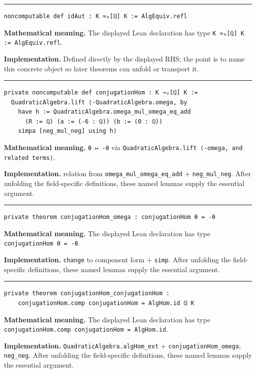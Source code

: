 \documentclass[UTF8,a4paper,11pt,fontset=fandol]{ctexart}
\theoremstyle{definition}
\newcommand{\statementsep}{\par\medskip\hrule\medskip}
\begin{document}
\statementsep
\begin{verbatim}
noncomputable def idAut : K ≃ₐ[ℚ] K := AlgEquiv.refl
\end{verbatim}
\noindent\textbf{Mathematical meaning.} The displayed Lean declaration has type \texttt{K ≃ₐ[ℚ] K := AlgEquiv.\allowbreak{}refl}.\par
\noindent\textbf{Implementation.} Defined directly by the displayed RHS; the point is to name this concrete object so later theorems can unfold or transport it.\par
\statementsep
\begin{verbatim}
private noncomputable def conjugationHom : K →ₐ[ℚ] K :=
  QuadraticAlgebra.lift ⟨-QuadraticAlgebra.omega, by
    have h := QuadraticAlgebra.omega_mul_omega_eq_add
      (R := ℚ) (a := (-6 : ℚ)) (b := (0 : ℚ))
    simpa [neg_mul_neg] using h⟩
\end{verbatim}
\noindent\textbf{Mathematical meaning.} \texttt{θ ↦ -θ} via \texttt{QuadraticAlgebra.\allowbreak{}lift ⟨-omega, and related terms⟩}.\par
\noindent\textbf{Implementation.} relation from \texttt{omega\_\allowbreak{}mul\_\allowbreak{}omega\_\allowbreak{}eq\_\allowbreak{}add} + \texttt{neg\_\allowbreak{}mul\_\allowbreak{}neg}. After unfolding the field-specific definitions, these named lemmas supply the essential argument.\par
\statementsep
\begin{verbatim}
private theorem conjugationHom_omega : conjugationHom θ = -θ
\end{verbatim}
\noindent\textbf{Mathematical meaning.} The displayed Lean declaration has type \texttt{conjugationHom θ = -θ}.\par
\noindent\textbf{Implementation.} \texttt{change} to component form + \texttt{simp}. After unfolding the field-specific definitions, these named lemmas supply the essential argument.\par
\statementsep
\begin{verbatim}
private theorem conjugationHom_conjugationHom :
    conjugationHom.comp conjugationHom = AlgHom.id ℚ K
\end{verbatim}
\noindent\textbf{Mathematical meaning.} The displayed Lean declaration has type \texttt{conjugationHom.\allowbreak{}comp conjugationHom = AlgHom.\allowbreak{}id}.\par
\noindent\textbf{Implementation.} \texttt{QuadraticAlgebra.\allowbreak{}algHom\_\allowbreak{}ext} + \texttt{conjugationHom\_\allowbreak{}omega}, \texttt{neg\_\allowbreak{}neg}. After unfolding the field-specific definitions, these named lemmas supply the essential argument.\par
\end{document}

